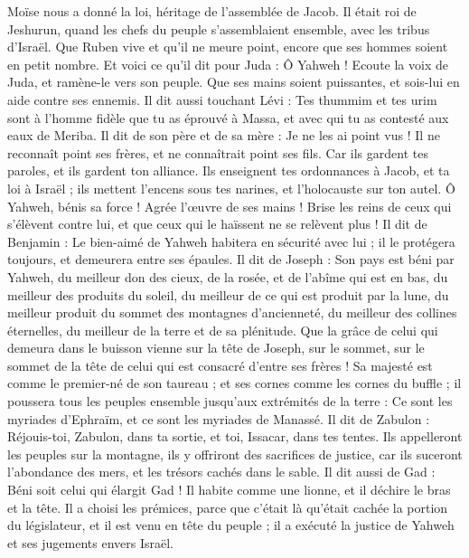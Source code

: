 \begin{multicols}{2}
Moïse nous a donné la loi, héritage de l'assemblée de Jacob.
Il était roi de Jeshurun, quand les chefs du peuple s'assemblaient ensemble, avec les tribus d'Israël.
Que Ruben vive et qu'il ne meure point, encore que ses hommes soient en petit nombre.
Et voici ce qu'il dit pour Juda : Ô Yahweh ! Ecoute la voix de Juda, et ramène-le vers son peuple. Que ses mains soient puissantes, et sois-lui en aide contre ses ennemis.
Il dit aussi touchant Lévi : Tes thummim et tes urim sont à l'homme fidèle que tu as éprouvé à Massa, et avec qui tu as contesté aux eaux de Meriba.
Il dit de son père et de sa mère : Je ne les ai point vus ! Il ne reconnaît point ses frères, et ne connaîtrait point ses fils. Car ils gardent tes paroles, et ils gardent ton alliance.
Ils enseignent tes ordonnances à Jacob, et ta loi à Israël ; ils mettent l'encens sous tes narines, et l'holocauste sur ton autel.
Ô Yahweh, bénis sa force ! Agrée l'œuvre de ses mains ! Brise les reins de ceux qui s'élèvent contre lui, et que ceux qui le haïssent ne se relèvent plus !
Il dit de Benjamin : Le bien-aimé de Yahweh habitera en sécurité avec lui ; il le protégera toujours, et demeurera entre ses épaules.
Il dit de Joseph : Son pays est béni par Yahweh, du meilleur don des cieux, de la rosée, et de l'abîme qui est en bas,
du meilleur des produits du soleil, du meilleur de ce qui est produit par la lune,
du meilleur produit du sommet des montagnes d'ancienneté, du meilleur des collines éternelles,
du meilleur de la terre et de sa plénitude. Que la grâce de celui qui demeura dans le buisson vienne sur la tête de Joseph, sur le sommet, sur le sommet de la tête de celui qui est consacré d'entre ses frères !
Sa majesté est comme le premier-né de son taureau ; et ses cornes comme les cornes du buffle ; il poussera tous les peuples ensemble jusqu'aux extrémités de la terre : Ce sont les myriades d'Ephraïm, et ce sont les myriades de Manassé.
Il dit de Zabulon : Réjouis-toi, Zabulon, dans ta sortie, et toi, Issacar, dans tes tentes.
Ils appelleront les peuples sur la montagne, ils y offriront des sacrifices de justice, car ils suceront l'abondance des mers, et les trésors cachés dans le sable.
Il dit aussi de Gad : Béni soit celui qui élargit Gad ! Il habite comme une lionne, et il déchire le bras et la tête.
Il a choisi les prémices, parce que c'était là qu'était cachée la portion du législateur, et il est venu en tête du peuple ; il a exécuté la justice de Yahweh et ses jugements envers Israël.

\end{multicols}
